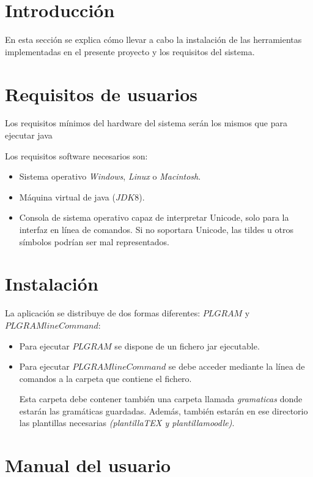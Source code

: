 
\section{Introducción}
En esta sección se explica cómo llevar a cabo la instalación de las herramientas implementadas en el presente proyecto y los requisitos del sistema.
\section{Requisitos de usuarios}
Los requisitos mínimos del hardware del sistema serán los mismos que para ejecutar java\cite{requisitos}

Los requisitos software necesarios son:

\begin{itemize}
\item Sistema operativo \textit{Windows}, \textit{Linux} o \textit{Macintosh}.
\item Máquina virtual de java ($JDK 8$).
\item Consola de sistema operativo capaz de interpretar Unicode, solo para la interfaz en línea de comandos. Si no soportara Unicode, las tildes u otros símbolos podrían ser mal representados.
\end{itemize}
\section{Instalación}
La aplicación se distribuye de dos formas diferentes: $PLGRAM$ y $PLGRAMlineCommand$:

\begin{itemize}
\item Para ejecutar $PLGRAM$ se dispone de un fichero jar ejecutable.
\item Para ejecutar $PLGRAMlineCommand$ se debe acceder mediante la línea de comandos a la carpeta que contiene el fichero.

Esta carpeta debe contener también una carpeta llamada \textit{gramaticas} donde estarán las gramáticas guardadas. Además, también estarán en ese directorio las plantillas necesarias \textit{(plantillaTEX y plantillamoodle)}.


\end{itemize}


\section{Manual del usuario}

